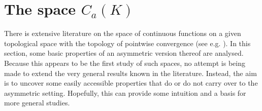 \documentclass[
	paper=A4,
	pagesize=auto,
	fontsize=12pt
]{scrartcl}
\theoremstyle{plain}
\theoremstyle{remark}
\theoremstyle{definition}
\begin{document}
\section{The space \texorpdfstring{$C_a(K)$}{Cₐ(K)}}
\label{sec:CaK}
%
There is extensive literature on the space of continuous functions on a given topological space with the topology of pointwise convergence (see e.g. \cite{src:Arkhangelskii1:TopologicalFunctionSpaces}).
In this section, some basic properties of an asymmetric version thereof are analysed.
Because this appears to be the first study of such spaces, no attempt is being made to extend the very general results known in the literature.
Instead, the aim is to uncover some easily accessible properties that do or do not carry over to the asymmetric setting.
Hopefully, this can provide some intuition and a basis for more general studies.
\end{document}
